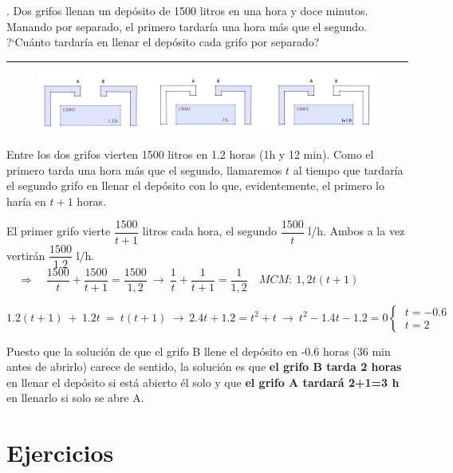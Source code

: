 \begin{miejercicio}
. Dos grifos llenan un depósito de 1500 litros en una hora y doce minutos. Manando por separado, el primero tardaría una hora más que el segundo. ?`Cuánto tardaría en llenar el depósito cada grifo por separado?

\rule{250pt}{0.1pt}

\begin{figure}[H]
	\centering
	\includegraphics[width=1\textwidth]{img-ecc/ecc03.png}
\end{figure}


Entre los dos grifos vierten 1500 litros en 1.2 horas (1h y 12 min). Como el primero tarda una hora más que el segundo, llamaremos $t$ al tiempo que tardaría el segundo grifo en llenar el depósito con lo que, evidentemente, el primero lo haría en $t+1$ horas.

\vspace{2mm} El primer grifo vierte $\dfrac {1500}{t+1}$ litros cada hora, el segundo $\dfrac {1500} {t} $ l/h. Ambos a la vez vertirán $\dfrac{1500}{1.2}$ l/h. 
$\quad \Rightarrow \quad  \dfrac {1500} {t} +\dfrac {1500}{t+1} = \dfrac{1500}{1,2} \ \to \ \dfrac {1} {t} +\dfrac {1}{t+1} = \dfrac{1}{1,2} \quad MCM:\ 1,2t(t+1)$

\vspace{2mm} $1.2 (t+1) \ + \ 1.2t \ = \ t(t+1) \ \to \ 2.4t+1.2=t^2+t \ \to \ t^2 -1.4 t-1.2=0 \begin{cases} \ t=-0.6\\ \ t=2\end{cases}  $ 

\vspace{2mm} Puesto que la solución de que el grifo B llene el depósito en -0.6 horas (36 min antes de abrirlo)  carece de sentido, la solución es que \textbf{el grifo B tarda 2 horas} en llenar el depósito si está abierto él solo y que \textbf{el grifo A tardará 2+1=3 h} en llenarlo  si solo se abre A.
\end{miejercicio}


\vspace{1cm}
\section{Ejercicios}
\vspace{0.5cm}

